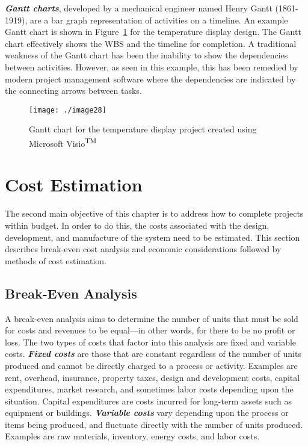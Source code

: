 \emph{\textbf{Gantt charts}}, developed by a mechanical engineer named
Henry Gantt (1861-1919), are a bar graph representation of activities on
a timeline. An example Gantt chart is shown in Figure~\ref{figure:ghantChart} for the
temperature display design. The Gantt chart effectively shows the WBS
and the timeline for completion. A traditional weakness of the Gantt
chart has been the inability to show the dependencies between
activities. However, as seen in this example, this has been remedied by
modern project management software where the dependencies are indicated
by the connecting arrows between tasks.

\begin{figure}[h]
\centering
\texttt{[image: ./image28]}
\caption{Gantt chart for the temperature display project
created using Microsoft Visio\textsuperscript{TM}}
\label{figure:ghantChart}
\end{figure}


\section{Cost Estimation}
\label{section:cost-estimation}

The second main objective of this chapter is to address how to complete
projects within budget. In order to do this, the costs associated with
the design, development, and manufacture of the system need to be
estimated. This section describes break-even cost analysis and economic
considerations followed by methods of cost estimation.

\subsection{Break-Even Analysis}
\label{subsection:break-even-analysis}

A break-even analysis aims to determine the number of units that must be
sold for costs and revenues to be equal---in other words, for there to
be no profit or loss. The two types of costs that factor into this
analysis are fixed and variable costs. \emph{\textbf{Fixed costs}} are
those that are constant regardless of the number of units produced and
cannot be directly charged to a process or activity. Examples are rent,
overhead, insurance, property taxes, design and development costs,
capital expenditures, market research, and sometimes labor costs
depending upon the situation. Capital expenditures are costs incurred
for long-term assets such as equipment or buildings.
\emph{\textbf{Variable costs}} vary depending upon the process or items
being produced, and fluctuate directly with the number of units
produced. Examples are raw materials, inventory, energy costs, and labor
costs.

